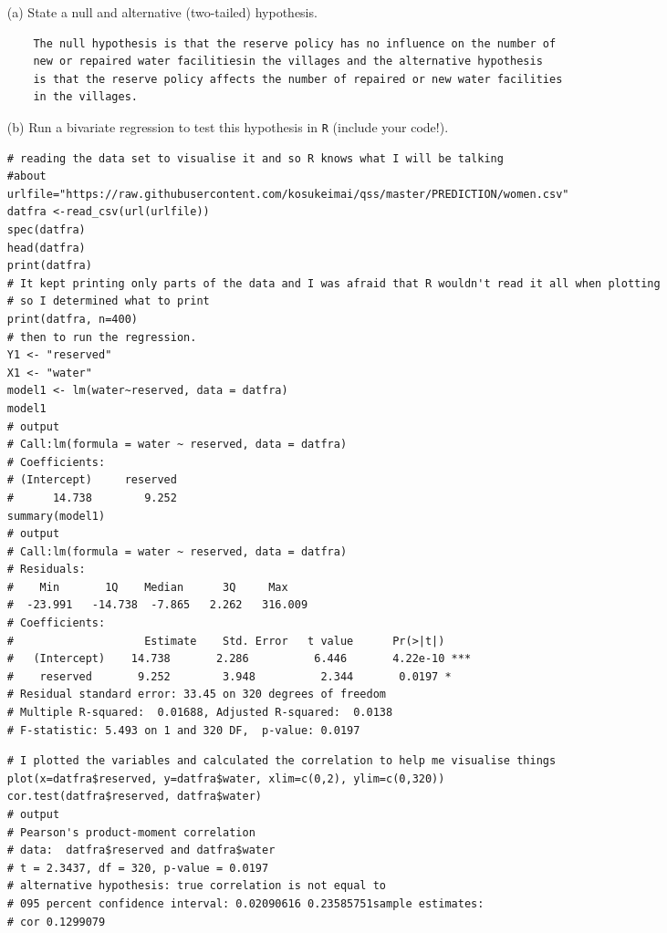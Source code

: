 \documentclass[12pt,letterpaper]{article}
\begin{document}
\newpage
\begin{enumerate}
	\item [(a)] State a null and alternative (two-tailed) hypothesis. 
	
\begin{verbatim}
	The null hypothesis is that the reserve policy has no influence on the number of
	new or repaired water facilitiesin the villages and the alternative hypothesis
	is that the reserve policy affects the number of repaired or new water facilities
    in the villages.
\end{verbatim}
	\vspace{6cm}
	\item [(b)] Run a bivariate regression to test this hypothesis in \texttt{R} (include your code!).
\begin{lstlisting}
# reading the data set to visualise it and so R knows what I will be talking
#about
urlfile="https://raw.githubusercontent.com/kosukeimai/qss/master/PREDICTION/women.csv"
datfra <-read_csv(url(urlfile))
spec(datfra)
head(datfra)
print(datfra)
# It kept printing only parts of the data and I was afraid that R wouldn't read it all when plotting
# so I determined what to print
print(datfra, n=400)
# then to run the regression. 
Y1 <- "reserved"
X1 <- "water"
model1 <- lm(water~reserved, data = datfra)
model1
# output 
# Call:lm(formula = water ~ reserved, data = datfra)
# Coefficients:
# (Intercept)     reserved
#      14.738        9.252  
summary(model1)
# output
# Call:lm(formula = water ~ reserved, data = datfra)
# Residuals:
#    Min       1Q    Median      3Q     Max 
#  -23.991   -14.738  -7.865   2.262   316.009
# Coefficients:          
#                    Estimate    Std. Error   t value      Pr(>|t|) 
#   (Intercept)    14.738       2.286          6.446       4.22e-10 ***
#    reserved       9.252        3.948          2.344       0.0197 *
# Residual standard error: 33.45 on 320 degrees of freedom
# Multiple R-squared:  0.01688,	Adjusted R-squared:  0.0138 
# F-statistic: 5.493 on 1 and 320 DF,  p-value: 0.0197
\end{lstlisting}

\begin{lstlisting}
# I plotted the variables and calculated the correlation to help me visualise things
plot(x=datfra$reserved, y=datfra$water, xlim=c(0,2), ylim=c(0,320))
cor.test(datfra$reserved, datfra$water)
# output
# Pearson's product-moment correlation
# data:  datfra$reserved and datfra$water
# t = 2.3437, df = 320, p-value = 0.0197
# alternative hypothesis: true correlation is not equal to 
# 095 percent confidence interval: 0.02090616 0.23585751sample estimates:      
# cor 0.1299079 
\end{lstlisting}	
	

\end{enumerate}
\end{document}
